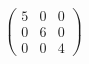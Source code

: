 \documentclass[preview]{standalone}
\begin{document}
\begin{align*}
\begin{pmatrix} 5 & 0 & 0 \\ 0 & 6 & 0 \\ 0 & 0 & 4 \end{pmatrix}
\end{align*}
\end{document}
